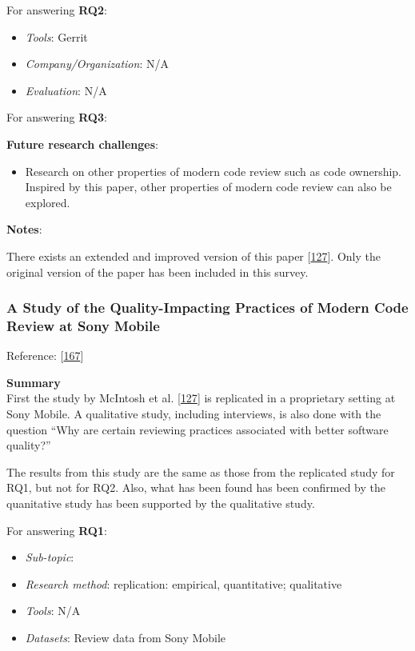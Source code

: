 \documentclass[]{book}
\providecommand{\tightlist}{%
  \setlength{\itemsep}{0pt}\setlength{\parskip}{0pt}}
\begin{document}
For answering \textbf{RQ2}:

\begin{itemize}
\tightlist
\item
  \emph{Tools}: Gerrit
\item
  \emph{Company/Organization}: N/A
\item
  \emph{Evaluation}: N/A
\end{itemize}

For answering \textbf{RQ3}:

\textbf{Future research challenges}:

\begin{itemize}
\tightlist
\item
  Research on other properties of modern code review such as code
  ownership. Inspired by this paper, other properties of modern code
  review can also be explored.
\end{itemize}

\textbf{Notes}:

There exists an extended and improved version of this paper
{[}\protect\hyperlink{ref-mcintosh2016empirical}{127}{]}. Only the
original version of the paper has been included in this survey.

\subsubsection{A Study of the Quality-Impacting Practices of Modern Code
Review at Sony
Mobile}\label{a-study-of-the-quality-impacting-practices-of-modern-code-review-at-sony-mobile}

Reference: {[}\protect\hyperlink{ref-shimagaki2016study}{167}{]}

\textbf{Summary}\\
First the study by McIntosh et al.
{[}\protect\hyperlink{ref-mcintosh2016empirical}{127}{]} is replicated
in a proprietary setting at Sony Mobile. A qualitative study, including
interviews, is also done with the question ``Why are certain reviewing
practices associated with better software quality?''

The results from this study are the same as those from the replicated
study for RQ1, but not for RQ2. Also, what has been found has been
confirmed by the quanitative study has been supported by the qualitative
study.

For answering \textbf{RQ1}:

\begin{itemize}
\tightlist
\item
  \emph{Sub-topic}:
\item
  \emph{Research method}: replication: empirical, quantitative;
  qualitative
\item
  \emph{Tools}: N/A
\item
  \emph{Datasets}: Review data from Sony Mobile
\end{itemize}
\end{document}
